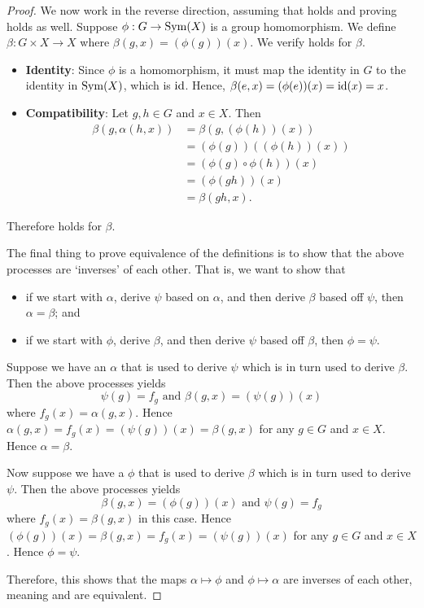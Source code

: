 \begin{proof}
    We now work in the reverse direction, assuming that  holds and proving  holds as well. Suppose $\phi: G \to \mathrm{Sym}(X)$ is a group homomorphism. We define $\beta: G \times X \to X$ where $\beta(g, x) = (\phi(g))(x)$. We verify  holds for $\beta$.
    \begin{itemize}
        \item \textbf{Identity}: Since $\phi$ is a homomorphism, it must map the identity in $G$ to the identity in $\mathrm{Sym}(X)$, which is $\mathrm{id}$. Hence, $\beta(e, x) = (\phi(e))(x) = \mathrm{id}(x) = x$.
        \item \textbf{Compatibility}: Let $g, h \in G$ and $x \in X$. Then
        \begin{align*}
            \beta(g, \alpha(h, x)) &= \beta(g, (\phi(h))(x))\\
            &= (\phi(g))((\phi(h))(x))\\
            &= (\phi(g) \circ \phi(h))(x)\\
            &= (\phi(gh))(x)\\
            &= \beta(gh, x).
        \end{align*}
    \end{itemize}
    Therefore  holds for $\beta$.

    The final thing to prove equivalence of the definitions is to show that the above processes are `inverses' of each other. That is, we want to show that
    \begin{itemize}
        \item if we start with $\alpha$, derive $\psi$ based on $\alpha$, and then derive $\beta$ based off $\psi$, then $\alpha = \beta$; and
        \item if we start with $\phi$, derive $\beta$, and then derive $\psi$ based off $\beta$, then $\phi = \psi$.
    \end{itemize}

    Suppose we have an $\alpha$ that is used to derive $\psi$ which is in turn used to derive $\beta$. Then the above processes yields
    \[
        \psi(g) = f_g \text{ and } \beta(g, x) = (\psi(g))(x)
    \]
    where $f_g(x) = \alpha(g, x)$. Hence $\alpha(g, x) = f_g(x) = (\psi(g))(x) = \beta(g, x)$ for any $g \in G$ and $x \in X$. Hence $\alpha = \beta$.

    Now suppose we have a $\phi$ that is used to derive $\beta$ which is in turn used to derive $\psi$. Then the above processes yields
    \[
        \beta(g, x) = (\phi(g))(x) \text{ and } \psi(g) = f_g
    \]
    where $f_g(x) = \beta(g, x)$ in this case. Hence $(\phi(g))(x) = \beta(g, x) = f_g(x) = (\psi(g))(x)$ for any $g \in G$ and $x \in X$. Hence $\phi = \psi$.

    Therefore, this shows that the maps $\alpha \mapsto \phi$ and $\phi \mapsto \alpha$ are inverses of each other, meaning  and  are equivalent.
\end{proof}

